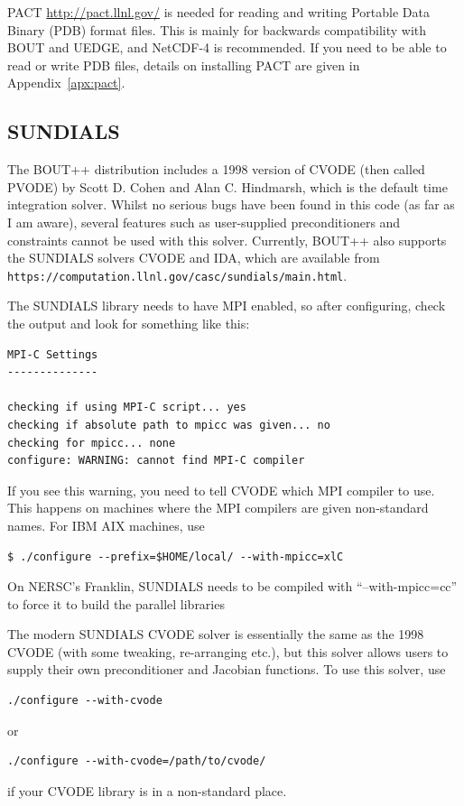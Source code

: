 \documentclass[12pt]{article}
\newcommand{\code}[1]{\texttt{#1}}
\begin{document}
PACT \url{http://pact.llnl.gov/} is needed for reading and writing Portable
Data Binary (PDB) format files. This is mainly for backwards compatibility with
BOUT and UEDGE, and NetCDF-4 is recommended.  If you need to be able to read or
write PDB files, details on installing PACT are given in
Appendix~\ref{apx:pact}.



\subsection{SUNDIALS}
%
The BOUT++ distribution includes a 1998 version of CVODE (then called PVODE) by
Scott D. Cohen and Alan C.  Hindmarsh, which is the default time integration
solver.  Whilst no serious bugs have been found in this code (as far as I am
aware), several features such as user-supplied preconditioners and constraints
cannot be used with this solver. Currently, BOUT++ also supports the SUNDIALS
solvers CVODE and IDA, which are available from
\code{https://computation.llnl.gov/casc/sundials/main.html}.

The SUNDIALS library needs to have MPI enabled, so after configuring, check the
output and look for something like this:
%
\begin{verbatim}
MPI-C Settings
--------------

checking if using MPI-C script... yes
checking if absolute path to mpicc was given... no
checking for mpicc... none
configure: WARNING: cannot find MPI-C compiler
\end{verbatim}
%
If you see this warning, you need to tell CVODE which MPI compiler to use.
This happens on machines where the MPI compilers are given non-standard names.
For IBM AIX machines, use
%
\begin{verbatim}
$ ./configure --prefix=$HOME/local/ --with-mpicc=xlC
\end{verbatim}
%
On NERSC's Franklin, SUNDIALS needs to be compiled with ``--with-mpicc=cc'' to
force it to build the parallel libraries

The modern SUNDIALS CVODE solver is essentially the same as the 1998 CVODE
(with some tweaking, re-arranging etc.), but this solver allows users to supply
their own preconditioner and Jacobian functions. To use this solver, use
%
\begin{verbatim}
./configure --with-cvode
\end{verbatim}
%
or
%
\begin{verbatim}
./configure --with-cvode=/path/to/cvode/
\end{verbatim}
%
if your CVODE library is in a non-standard place.
\end{document}
